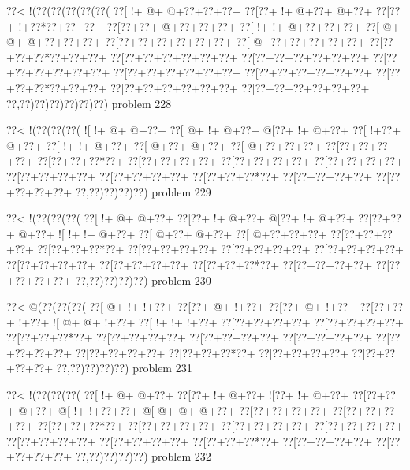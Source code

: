 \vbox{\vbox{\goo
\0??<\- !(\0??(\0??(\0??(\0??(\0??(
\0??[\- !+\- @+\- @+\0??+\0??+\0??+
\0??[\0??+\- !+\- @+\0??+\- @+\0??+
\0??[\0??+\- !+\0??*\0??+\0??+\0??+
\0??[\0??+\0??+\- @+\0??+\0??+\0??+
\0??[\- !+\- !+\- @+\0??+\0??+\0??+
\0??[\- @+\- @+\- @+\0??+\0??+\0??+
\0??[\0??+\0??+\0??+\0??+\0??+\0??+
\0??[\- @+\0??+\0??+\0??+\0??+\0??+
\0??[\0??+\0??+\0??*\0??+\0??+\0??+
\0??[\0??+\0??+\0??+\0??+\0??+\0??+
\0??[\0??+\0??+\0??+\0??+\0??+\0??+
\0??[\0??+\0??+\0??+\0??+\0??+\0??+
\0??[\0??+\0??+\0??+\0??+\0??+\0??+
\0??[\0??+\0??+\0??+\0??+\0??+\0??+
\0??[\0??+\0??+\0??*\0??+\0??+\0??+
\0??[\0??+\0??+\0??+\0??+\0??+\0??+
\0??[\0??+\0??+\0??+\0??+\0??+\0??+
\0??,\0??)\0??)\0??)\0??)\0??)\0??)
}
\hfil problem 228\hfil\break
}

\vbox{\vbox{\goo
\0??<\- !(\0??(\0??(\0??(
\- ![\- !+\- @+\- @+\0??+
\0??[\- @+\- !+\- @+\0??+
\- @[\0??+\- !+\- @+\0??+
\0??[\- !+\0??+\- @+\0??+
\0??[\- !+\- !+\- @+\0??+
\0??[\- @+\0??+\- @+\0??+
\0??[\- @+\0??+\0??+\0??+
\0??[\0??+\0??+\0??+\0??+
\0??[\0??+\0??+\0??*\0??+
\0??[\0??+\0??+\0??+\0??+
\0??[\0??+\0??+\0??+\0??+
\0??[\0??+\0??+\0??+\0??+
\0??[\0??+\0??+\0??+\0??+
\0??[\0??+\0??+\0??+\0??+
\0??[\0??+\0??+\0??*\0??+
\0??[\0??+\0??+\0??+\0??+
\0??[\0??+\0??+\0??+\0??+
\0??,\0??)\0??)\0??)\0??)
}
\hfil problem 229\hfil\break
}

\vbox{\vbox{\goo
\0??<\- !(\0??(\0??(\0??(
\0??[\- !+\- @+\- @+\0??+
\0??[\0??+\- !+\- @+\0??+
\- @[\0??+\- !+\- @+\0??+
\0??[\0??+\0??+\- @+\0??+
\- ![\- !+\- !+\- @+\0??+
\0??[\- @+\0??+\- @+\0??+
\0??[\- @+\0??+\0??+\0??+
\0??[\0??+\0??+\0??+\0??+
\0??[\0??+\0??+\0??*\0??+
\0??[\0??+\0??+\0??+\0??+
\0??[\0??+\0??+\0??+\0??+
\0??[\0??+\0??+\0??+\0??+
\0??[\0??+\0??+\0??+\0??+
\0??[\0??+\0??+\0??+\0??+
\0??[\0??+\0??+\0??*\0??+
\0??[\0??+\0??+\0??+\0??+
\0??[\0??+\0??+\0??+\0??+
\0??,\0??)\0??)\0??)\0??)
}
\hfil problem 230\hfil\break
}

\vbox{\vbox{\goo
\0??<\- @(\0??(\0??(\0??(
\0??[\- @+\- !+\- !+\0??+
\0??[\0??+\- @+\- !+\0??+
\0??[\0??+\- @+\- !+\0??+
\0??[\0??+\0??+\- !+\0??+
\- ![\- @+\- @+\- !+\0??+
\0??[\- !+\- !+\- !+\0??+
\0??[\0??+\0??+\0??+\0??+
\0??[\0??+\0??+\0??+\0??+
\0??[\0??+\0??+\0??*\0??+
\0??[\0??+\0??+\0??+\0??+
\0??[\0??+\0??+\0??+\0??+
\0??[\0??+\0??+\0??+\0??+
\0??[\0??+\0??+\0??+\0??+
\0??[\0??+\0??+\0??+\0??+
\0??[\0??+\0??+\0??*\0??+
\0??[\0??+\0??+\0??+\0??+
\0??[\0??+\0??+\0??+\0??+
\0??,\0??)\0??)\0??)\0??)
}
\hfil problem 231\hfil\break
}

\vbox{\vbox{\goo
\0??<\- !(\0??(\0??(\0??(
\0??[\- !+\- @+\- @+\0??+
\0??[\0??+\- !+\- @+\0??+
\- ![\0??+\- !+\- @+\0??+
\0??[\0??+\0??+\- @+\0??+
\- @[\- !+\- !+\0??+\0??+
\- @[\- @+\- @+\- @+\0??+
\0??[\0??+\0??+\0??+\0??+
\0??[\0??+\0??+\0??+\0??+
\0??[\0??+\0??+\0??*\0??+
\0??[\0??+\0??+\0??+\0??+
\0??[\0??+\0??+\0??+\0??+
\0??[\0??+\0??+\0??+\0??+
\0??[\0??+\0??+\0??+\0??+
\0??[\0??+\0??+\0??+\0??+
\0??[\0??+\0??+\0??*\0??+
\0??[\0??+\0??+\0??+\0??+
\0??[\0??+\0??+\0??+\0??+
\0??,\0??)\0??)\0??)\0??)
}
\hfil problem 232\hfil\break
}

